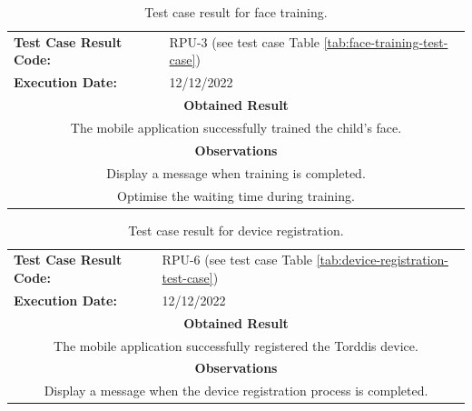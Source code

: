 \documentclass[a4paper,fleqn]{cas-sc}
\begin{document}
			\begin{table}[hbt!]
				\centering
				\caption{Test case result for face training.}
				\label{tab:face-training-result}
				\begin{tabularx}{\textwidth}{l X}
					\toprule
					\textbf{Test Case Result Code:} & RPU-3 (see test case Table \ref{tab:face-training-test-case}) \\
					\textbf{Execution Date:} & 12/12/2022 \\
					\midrule
					\multicolumn{2}{c}{\textbf{Obtained Result}} \\
					\midrule
					\multicolumn{2}{c}{The mobile application successfully trained the child's face.} \\
					\midrule
					\multicolumn{2}{c}{\textbf{Observations}} \\
					\midrule
					\multicolumn{2}{c}{Display a message when training is completed.} \\
					\multicolumn{2}{c}{Optimise the waiting time during training.} \\
					\bottomrule
				\end{tabularx}
			\end{table}
			
			\begin{table}[hbt!]
				\centering
				\caption{Test case result for device registration.}
				\label{tab:device-registration-result}
				\begin{tabularx}{\textwidth}{l X}
					\toprule
					\textbf{Test Case Result Code:} & RPU-6 (see test case Table \ref{tab:device-registration-test-case}) \\
					\textbf{Execution Date:} & 12/12/2022 \\
					\midrule
					\multicolumn{2}{c}{\textbf{Obtained Result}} \\
					\midrule
					\multicolumn{2}{c}{The mobile application successfully registered the Torddis device.} \\
					\midrule
					\multicolumn{2}{c}{\textbf{Observations}} \\
					\midrule
					\multicolumn{2}{c}{Display a message when the device registration process is completed.} \\
					\bottomrule
				\end{tabularx}
			\end{table}
			
\end{document}
